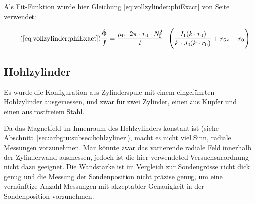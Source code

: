 {	\begin{minipage}[t]{0.33\textwidth}
        \vspace{0mm}
        

        \vspace{1em}

        Als Fit-Funktion wurde hier  Gleichung \ref{eq:vollzylinder:phiExact}
        von Seite \pageref{eq:vollzylinder:phiExact} verwendet:

        \begin{equation}
            \tag{\ref{eq:vollzylinder:phiExact}}
            \frac{\hat{\Phi}}{\hat{I}} = \frac{\mu_0 \cdot 2\pi \cdot r_0 \cdot N_0^2}{l} \cdot \Biggl(\frac{J_1 (k \cdot r_0)}{k \cdot J_0 (k \cdot r_0)} + r_{Sp} - r_0 \Biggr)
        \end{equation}

	\end{minipage}%
	\begin{minipage}[t]{0.67\textwidth}
        \vspace{0mm}
        \resizebox{.95\textwidth}{!}{}
        \label{fig:alu:freq:phi}
	\end{minipage}


    \clearpage
} %




\clearpage
\subsection{Hohlzylinder}
\label{sec:ausw:subsec:hohlz}


Es  wurde  die  Konfiguration   aus  Zylinderspule  mit  einem  eingef\"uhrten
Hohlzylinder ausgemessen, und  zwar f\"ur zwei Zylinder, einen  aus Kupfer und
einen aus rostfreiem Stahl.

Da  das  Magnetfeld  im  Innenraum   des  Hohlzylinders  konstant  ist  (siehe
Abschnitt~\ref{sec:arbgru:subsec:hohlzyliner}),  macht  es  nicht  viel  Sinn,
radiale  Messungen  vorzunehmen. Man  k\"onnte zwar  das  variierende  radiale
Feld innerhalb  der Zylinderwand  ausmessen, jedoch  ist die  hier verwendeted
Versuchsanordnung nicht  dazu geeignet. Die Wandst\"arke ist  im Vergleich zur
Sondengr\"osse  nicht dick  genug  und die  Messung  der Sondenposition  nicht
pr\"azise  genug,  um  eine  vern\"unftige Anzahl  Messungen  mit  akzeptabler
Genauigkeit in der Sondenposition vorzunehmen.

